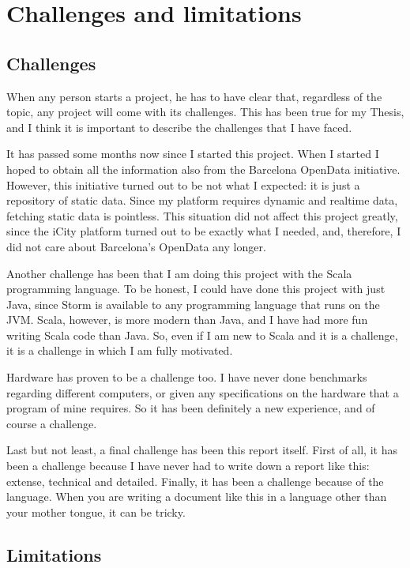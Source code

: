 
\section{Challenges and limitations}

\subsection{Challenges}

When any person starts a project, he has to have clear that, regardless of the
topic, any project will come with its challenges. This has been true for my
Thesis, and I think it is important to describe the challenges that I have
faced.

It has passed some months now since I started this project. When I started I
hoped to obtain all the information also from the Barcelona OpenData
initiative. However, this initiative turned out to be not what I expected: it
is just a repository of static data. Since my platform requires dynamic and
realtime data, fetching static data is pointless. This situation did not
affect this project greatly, since the iCity platform turned out to be exactly
what I needed, and, therefore, I did not care about Barcelona's OpenData any
longer.

Another challenge has been that I am doing this project with the Scala
programming language. To be honest, I could have done this project with just
Java, since Storm is available to any programming language that runs on the
\ac{JVM}. Scala, however, is more modern than Java, and I have had more fun
writing Scala code than Java. So, even if I am new to Scala and it is a
challenge, it is a challenge in which I am fully motivated.

Hardware has proven to be a challenge too. I have never done benchmarks
regarding different computers, or given any specifications on the hardware that
a program of mine requires. So it has been definitely a new experience, and of
course a challenge.

Last but not least, a final challenge has been this report itself. First of
all, it has been a challenge because I have never had to write down a report
like this: extense, technical and detailed. Finally, it has been a challenge
because of the language. When you are writing a document like this in a
language other than your mother tongue, it can be tricky.

\subsection{Limitations}

